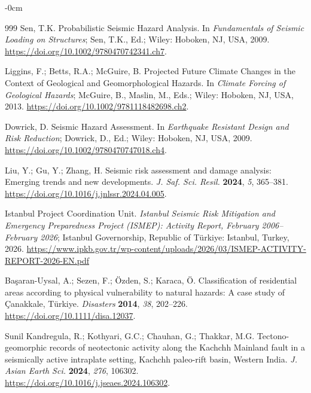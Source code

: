\documentclass[data,article,accept,pdftex,moreauthors]{Definitions/mdpi}
\begin{document}
\begin{adjustwidth}{-\extralength}{0cm}
\begin{thebibliography}{999}
Sen, T.K. Probabilistic Seismic Hazard Analysis. In \emph{Fundamentals of Seismic Loading on Structures}; Sen, T.K., Ed.; Wiley: Hoboken, NJ, USA, %
2009. \url{https://doi.org/10.1002/9780470742341.ch7}.

Liggins, F.; Betts, R.A.; McGuire, B. Projected Future Climate Changes in the Context of Geological and Geomorphological Hazards. In \emph{Climate Forcing of Geological Hazards}; McGuire, B., Maslin, M., Eds.; Wiley: Hoboken, NJ, USA, %
 2013. \url{https://doi.org/10.1002/9781118482698.ch2}.

Dowrick, D. Seismic Hazard Assessment. In \emph{Earthquake Resistant Design and Risk Reduction}; Dowrick, D., Ed.; Wiley: Hoboken, NJ, USA, %
 2009. \url{https://doi.org/10.1002/9780470747018.ch4}.

Liu, Y.; Gu, Y.; Zhang, H. Seismic risk assessment and damage analysis: Emerging trends and new developments. \emph{J. Saf. Sci. Resil.} \textbf{2024}, \emph{5}, 365--381. \url{https://doi.org/10.1016/j.jnlssr.2024.04.005}.

Istanbul Project Coordination Unit. \emph{Istanbul Seismic Risk Mitigation and Emergency Preparedness Project (ISMEP): Activity Report, February 2006--February 2026}; Istanbul Governorship, Republic of T\"{u}rkiye: Istanbul, Turkey, 2026. \url{https://www.ipkb.gov.tr/wp-content/uploads/2026/03/ISMEP-ACTIVITY-REPORT-2026-EN.pdf}

Başaran-Uysal, A.; Sezen, F.; Özden, S.; Karaca, Ö. Classification of residential areas according to physical vulnerability to natural hazards: A case study of Çanakkale, Türkiye. \emph{Disasters} \textbf{2014}, \emph{38}, 202--226. \url{https://doi.org/10.1111/disa.12037}.

Sunil Kandregula, R.; Kothyari, G.C.; Chauhan, G.; Thakkar, M.G. Tectono-geomorphic records of neotectonic activity along the Kachchh Mainland fault in a seismically active intraplate setting, Kachchh paleo-rift basin, Western India. \emph{J. Asian Earth Sci.} \textbf{2024}, \emph{276}, 106302. \url{https://doi.org/10.1016/j.jseaes.2024.106302}.


\end{thebibliography}
\end{adjustwidth}
\end{document}
